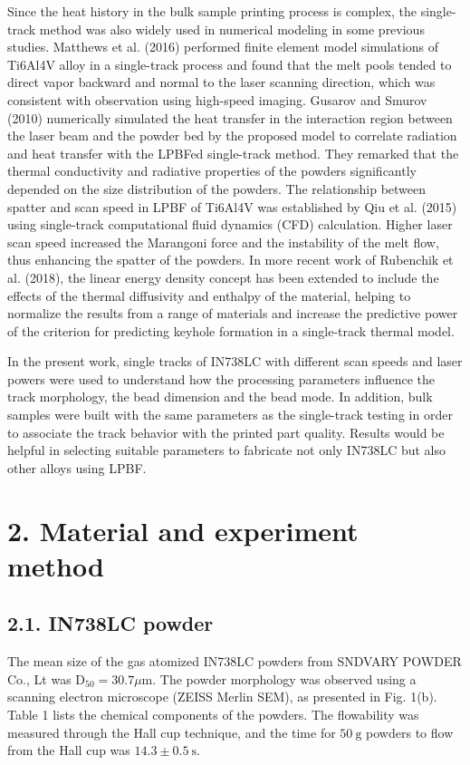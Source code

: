 \documentclass[10pt]{article}
\begin{document}
Since the heat history in the bulk sample printing process is complex, the single-track method was also widely used in numerical modeling in some previous studies. Matthews et al. (2016) performed finite element model simulations of Ti6Al4V alloy in a single-track process and found that the melt pools tended to direct vapor backward and normal to the laser scanning direction, which was consistent with observation using high-speed imaging. Gusarov and Smurov (2010) numerically simulated the heat transfer in the interaction region between the laser beam and the powder bed by the proposed model to correlate radiation and heat transfer with the LPBFed single-track method. They remarked that the thermal conductivity and radiative properties of the powders significantly depended on the size distribution of the powders. The relationship between spatter and scan speed in LPBF of Ti6Al4V was established by Qiu et al. (2015) using single-track computational fluid dynamics (CFD) calculation. Higher laser scan speed increased the Marangoni force and the instability of the melt flow, thus enhancing the spatter of the powders. In more recent work of Rubenchik et al. (2018), the linear energy density concept has been extended to include the effects of the thermal diffusivity and enthalpy of the material, helping to normalize the results from a range of materials and increase the predictive power of the criterion for predicting keyhole formation in a single-track thermal model.

In the present work, single tracks of IN738LC with different scan speeds and laser powers were used to understand how the processing parameters influence the track morphology, the bead dimension and the bead mode. In addition, bulk samples were built with the same parameters as the single-track testing in order to associate the track behavior with the printed part quality. Results would be helpful in selecting suitable parameters to fabricate not only IN738LC but also other alloys using LPBF.

\section*{2. Material and experiment method}
\subsection*{2.1. IN738LC powder}
The mean size of the gas atomized IN738LC powders from SNDVARY POWDER Co., Lt was $\mathrm{D}_{50}=30.7 \mu \mathrm{m}$. The powder morphology was observed using a scanning electron microscope (ZEISS Merlin SEM), as presented in Fig. 1(b). Table 1 lists the chemical components of the powders. The flowability was measured through the Hall cup technique, and the time for $50 \mathrm{~g}$ powders to flow from the Hall cup was $14.3 \pm 0.5 \mathrm{~s}$.
\end{document}
